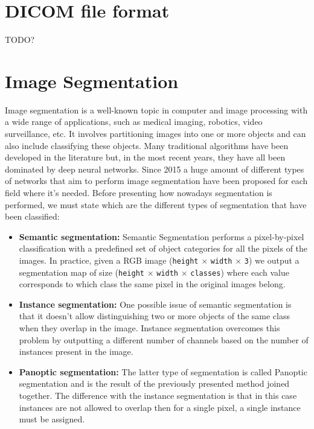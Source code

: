 \section{DICOM file format}
TODO?

\section{Image Segmentation}
Image segmentation is a well-known topic in computer and image processing with a
wide range of applications, such as medical imaging, robotics, video
surveillance, etc.
It involves partitioning images into one or more objects and can also include
classifying these objects. Many traditional algorithms have been developed in the
literature but, in the most recent years, they have all been dominated by deep
neural networks. Since 2015 a huge amount of different types of networks
that aim to perform image segmentation have been proposed for each field
where it's needed.
Before presenting how nowadays segmentation is performed, we must state which are
the different types of segmentation that have been classified:

\begin{itemize}
  \item{\textbf{Semantic segmentation:}
  Semantic Segmentation performs a pixel-by-pixel classification with a predefined
  set of object categories for all the pixels of the images. In practice, given a
  RGB image (\texttt{height} $\times$ \texttt{width} $\times$ \texttt{3}) we output
  a segmentation map of size (\texttt{height} $\times$ \texttt{width} $\times$
  \texttt{classes}) where each value corresponds to which class the same pixel in the
  original images belong.}

  \item{\textbf{Instance segmentation:}
  One possible issue of semantic segmentation is that it doesn't allow distinguishing two or more objects of the same class when they overlap in the image.
  Instance segmentation overcomes this problem by outputting a different number of
  channels based on the number of instances present in the image.}

  \item{\textbf{Panoptic segmentation:}
  The latter type of segmentation is called Panoptic segmentation and is the
  result of the previously presented method joined together. The difference with
  the instance segmentation is that in this case instances are not allowed to
  overlap then for a single pixel, a single instance must be assigned.}
\end{itemize}

